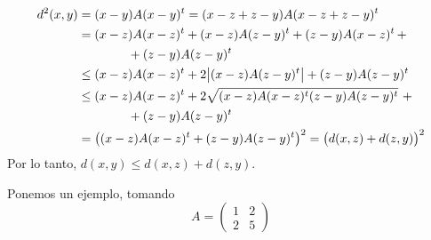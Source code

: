 \begin{ej}
\begin{enumerate}[(a)]
\begin{enumerate}[i)]
\begin{align*}
						d^2(x,y) &= (x-y)A(x-y)^t = (x-z+z-y)A(x-z+z-y)^t \\
						&= (x-z)A(x-z)^t + (x-z)A(z-y)^t + (z-y)A(x-z)^t\, + \\
						&\qquad\qquad + (z-y)A(z-y)^t \\
						&\leq (x-z)A(x-z)^t + 2 \abs{(x-z)A(z-y)^t} + (z-y)A(z-y)^t \\
						&\leq (x-z)A(x-z)^t + 2 \sqrt{(x-z)A(x-z)^t(z-y)A(z-y)^t} \,\,+ \\
						&\qquad\qquad + (z-y)A(z-y)^t \\
						&= \left( (x-z)A(x-z)^t + (z-y)A(z-y)^t \right)^2 = \left( d(x,z) + d(z,y) \right)^2
					\end{align*}
					Por lo tanto, $d(x,y) \leq d(x,z) + d(z,y)$.
			\end{enumerate}
			Ponemos un ejemplo, tomando
			\[
				A =
				\begin{pmatrix}
					1 & 2 \\
					2 & 5
				\end{pmatrix}
			\]
			\begin{center}
				
			\end{center}
	\end{enumerate}
\end{ej}

